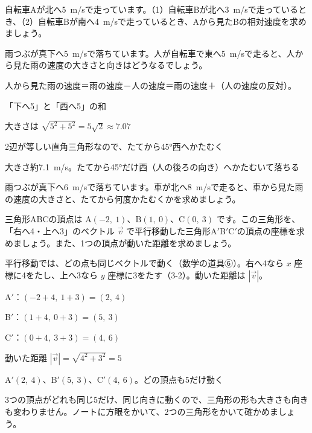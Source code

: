 \begin{jibun}
自転車Aが北へ\qty{5}{m/s}で走っています。（1）自転車Bが北へ\qty{3}{m/s}で走っているとき、（2）自転車Bが南へ\qty{4}{m/s}で走っているとき、Aから見たBの相対速度を求めましょう。
\end{jibun}


\begin{reidai}[車から見た雨の速度]
雨つぶが真下へ\qty{5}{m/s}で落ちています。人が自転車で東へ\qty{5}{m/s}で走ると、人から見た雨の速度の大きさと向きはどうなるでしょう。\par
\kangaekata 人から見た雨の速度＝雨の速度－人の速度＝雨の速度＋（人の速度の反対）。\par
\shiki 「下へ5」と「西へ5」の和\par
\hspace*{2.6\zw}大きさは $\sqrt{5^2+5^2}=5\sqrt2\approx7.07$\par
\hspace*{2.6\zw}2辺が等しい直角三角形なので、たてから45°西へかたむく\par
\kotae 大きさ約\qty{7.1}{m/s}。たてから45°だけ西（人の後ろの向き）へかたむいて落ちる
\end{reidai}

\begin{jibun}
雨つぶが真下へ\qty{6}{m/s}で落ちています。車が北へ\qty{8}{m/s}で走ると、車から見た雨の速度の大きさと、たてから何度かたむくかを求めましょう。
\end{jibun}

\begin{reidai}[平行移動した点の座標]
三角形ABCの頂点は $\mathrm{A}(-2,\ 1)$、$\mathrm{B}(1,\ 0)$、$\mathrm{C}(0,\ 3)$ です。この三角形を、「右へ4・上へ3」のベクトル $\vec{v}$ で平行移動した三角形A$'$B$'$C$'$の頂点の座標を求めましょう。また、1つの頂点が動いた距離を求めましょう。\par
\kangaekata 平行移動では、どの点も同じベクトルで動く（数学の道具⑥）。右へ4なら $x$ 座標に4をたし、上へ3なら $y$ 座標に3をたす（3-2）。動いた距離は $|\vec{v}|$。\par
\shiki A$'$：$(-2+4,\ 1+3)=(2,\ 4)$\par
\hspace*{2.6\zw}B$'$：$(1+4,\ 0+3)=(5,\ 3)$\par
\hspace*{2.6\zw}C$'$：$(0+4,\ 3+3)=(4,\ 6)$\par
\hspace*{2.6\zw}動いた距離 $|\vec{v}|=\sqrt{4^2+3^2}=5$\par
\kotae A$'(2,\ 4)$、B$'(5,\ 3)$、C$'(4,\ 6)$。どの頂点も5だけ動く
\end{reidai}
3つの頂点がどれも同じ5だけ、同じ向きに動くので、三角形の形も大きさも向きも変わりません。ノートに方眼をかいて、2つの三角形をかいて確かめましょう。

